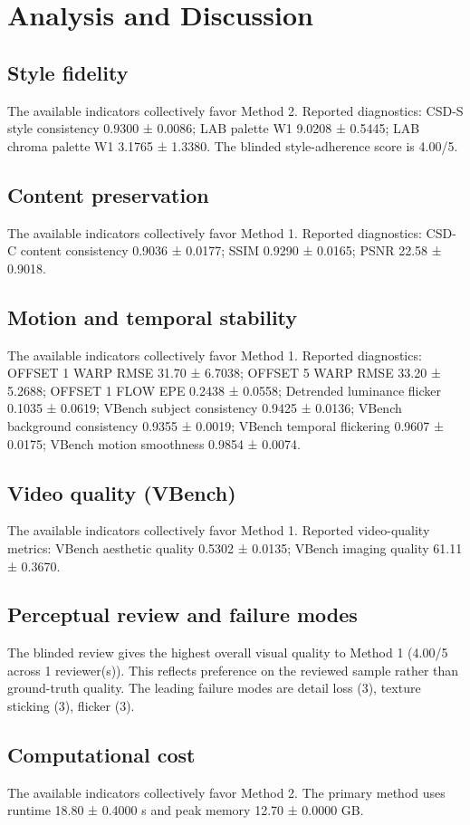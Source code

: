 \documentclass[10pt]{article}
\begin{document}
\section*{Analysis and Discussion}
\subsection*{Style fidelity}
The available indicators collectively favor Method 2. Reported diagnostics: CSD-S style consistency 0.9300 ± 0.0086; LAB palette W1 9.0208 ± 0.5445; LAB chroma palette W1 3.1765 ± 1.3380. The blinded style-adherence score is 4.00/5.
\subsection*{Content preservation}
The available indicators collectively favor Method 1. Reported diagnostics: CSD-C content consistency 0.9036 ± 0.0177; SSIM 0.9290 ± 0.0165; PSNR 22.58 ± 0.9018.
\subsection*{Motion and temporal stability}
The available indicators collectively favor Method 1. Reported diagnostics: OFFSET 1 WARP RMSE 31.70 ± 6.7038; OFFSET 5 WARP RMSE 33.20 ± 5.2688; OFFSET 1 FLOW EPE 0.2438 ± 0.0558; Detrended luminance flicker 0.1035 ± 0.0619; VBench subject consistency 0.9425 ± 0.0136; VBench background consistency 0.9355 ± 0.0019; VBench temporal flickering 0.9607 ± 0.0175; VBench motion smoothness 0.9854 ± 0.0074.
\subsection*{Video quality (VBench)}
The available indicators collectively favor Method 1. Reported video-quality metrics: VBench aesthetic quality 0.5302 ± 0.0135; VBench imaging quality 61.11 ± 0.3670.
\subsection*{Perceptual review and failure modes}
The blinded review gives the highest overall visual quality to Method 1 (4.00/5 across 1 reviewer(s)). This reflects preference on the reviewed sample rather than ground-truth quality. The leading failure modes are detail loss (3), texture sticking (3), flicker (3).
\subsection*{Computational cost}
The available indicators collectively favor Method 2. The primary method uses runtime 18.80 ± 0.4000 s and peak memory 12.70 ± 0.0000 GB.
\end{document}
